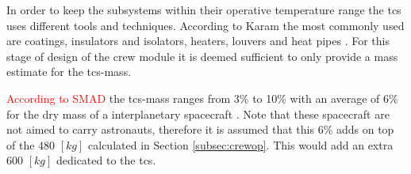 In order to keep the subsystems within their operative temperature range the \gls{tcs} uses different tools and techniques. According to Karam the most commonly used are coatings, insulators and isolators, heaters, louvers and heat pipes \cite{Karam1998}. For this stage of design of the crew module it is deemed sufficient to only provide a mass estimate for the \gls{tcs}-mass.

\textcolor{red}{According to SMAD} the \gls{tcs}-mass ranges from 3\% to 10\% with an average of 6\% for the dry mass of a interplanetary spacecraft \cite{Wertz2011}. Note that these spacecraft are not aimed to carry astronauts, therefore it is assumed that this 6\% adds on top of the 480 $[kg]$ calculated in Section \ref{subsec:crewop}. This would add an extra 600 $[kg]$ dedicated to the \gls{tcs}.
